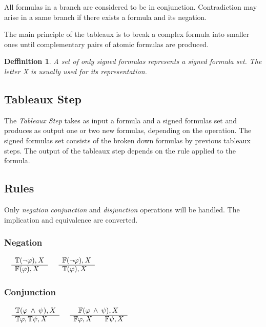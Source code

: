 \documentclass{article}
\newtheorem{defn}[theorem]{Deffinition}
\begin{document}
	All formulas in a branch are considered to be in conjunction. Contradiction may arise in a same branch if there exists a formula and its negation.

	The main principle of the tableaux is to break a complex formula into smaller ones until complementary pairs of atomic formulas are produced.

	\begin{defn}
		A set of only signed formulas represents a signed formula set. The letter \textit{X} is usually used for its representation.
	\end{defn}

	\subsection{Tableaux Step}
	The \textit{Tableaux Step} takes as input a formula and a signed formulas set and produces as output one or two new formulas, depending on the operation.
	The signed formulas set consists of the broken down formulas by previous tableaux steps.
	The output of the tableaux step depends on the rule applied to the formula.

	\subsection{Rules}
	Only \textit{negation} \textit{conjunction} and \textit{disjunction} operations will be handled. The implication and equivalence are converted.

		\subsubsection*{Negation}
			$\begin{array}{rl}
				& \mathbb{T}(\neg \varphi), X \\
			      \cline{2-2}
			      & \mathbb{F}(\varphi), X
			\end{array}$
			\:\:\:\:\:\:\:\:\:\:\:\:\:\:\:\:\:\:\:\:\:\:\:\:\:\:\:\:\:\:\:\:\:\:\:\:\:\:\:\:\:\:\:\:\:\:\:\:
			$\begin{array}{rl}
				& \mathbb{F}(\neg \varphi), X \\
			      \cline{2-2}
			      & \mathbb{T}(\varphi), X
			\end{array}$

		\subsubsection*{Conjunction}
			$\begin{array}{rl}
				& \mathbb{T}(\varphi \: \wedge \: \psi), X \\
			      \cline{2-2}
			      & \mathbb{T}\varphi, \mathbb{T}\psi, X
			\end{array}$
			\:\:\:\:\:\:\:\:\:\:\:\:\:\:\:\:\:\:\:\:\:\:\:\:\:\:\:\:\:\:\:\:\:\:\:
			$\begin{array}{rl}
				& \:\:\: \mathbb{F}(\varphi \: \wedge \: \psi), X \\
			      \cline{2-2}
			      & \mathbb{F}\varphi, X \:\:\:\:\:\:\:\: \mathbb{F}\psi, X
			\end{array}$
\end{document}
